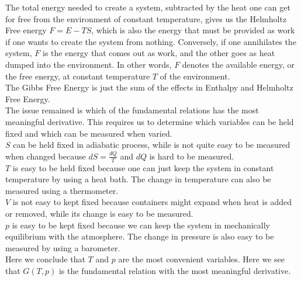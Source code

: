 \documentclass[11pt]{article}
\theoremstyle{break}
\theoremstyle{break}
\begin{document}
The total energy needed to create a system, subtracted by the heat one can get for free from the environment of constant temperature, gives us the Helmholtz Free energy $F=E-TS$, which is also the energy that must be provided as work if one wants to create the system from nothing. Conversely, if one annihilates the system, $F$ is the energy that comes out as work, and the other goes as heat dumped into the environment. In other words, $F$ denotes the available energy, or the free energy, at constant temperature $T$ of the environment.\\

The Gibbs Free Energy is just the sum of the effects in Enthalpy and Helmholtz Free Energy.\\

The issue remained is which of the fundamental relations has the most meaningful derivative. This requires us to determine which variables can be held fixed and which can be measured when varied.\\

$S$ can be held fixed in adiabatic process, while is not quite easy to be measured when changed because $dS = \frac{dQ}{T}$ and $dQ$ is hard to be measured.\\

$T$ is easy to be held fixed because one can just keep the system in constant temperature by using a heat bath. The change in temperature can also be measured using a thermometer.\\

$V$ is not easy to kept fixed because containers might expand when heat is added or removed, while its change is easy to be measured.\\

$p$ is easy to be kept fixed because we can keep the system in mechanically equilibrium with the atmosphere. The change in pressure is also easy to be measured by using a barometer.\\

Here we conclude that $T$ and $p$ are the most convenient variables. Here we see that $G(T,p)$ is the fundamental relation with the most meaningful derivative. \\
\end{document}
